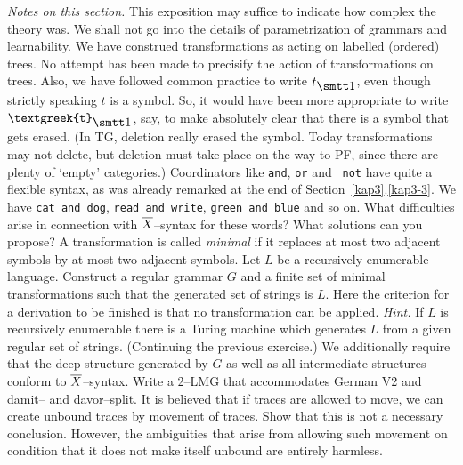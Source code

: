 {\it Notes on this section.}
This exposition may suffice to indicate how complex the theory
was. We shall not go into the details of parametrization of
grammars and learnability. We have construed transformations 
as acting on labelled (ordered) trees. No attempt has been 
made to precisify the action of transformations on trees. 
Also, we have followed common practice to write $t_{\seins}$, 
even though strictly speaking $t$ is a symbol. So, it would 
have been more appropriate to write $\mbox{\tt\textgreek{t}}_{\seins}$, 
say, to make absolutely clear that there is a symbol that gets 
erased. (In TG, deletion really erased the symbol. Today transformations 
may not delete, but deletion must take place on the way to 
PF, since there are plenty of `empty' categories.)
\vplatz
\exercise
Coordinators like {\tt and}, {\tt or} and {\tt
not} have quite a flexible syntax, as was already remarked at the
end of Section~\ref{kap3}.\ref{kap3-3}. We have {\tt cat and dog}, 
{\tt read and write}, {\tt green and blue} and so on. What difficulties
arise in connection with $\overline{X}$--syntax for these words? What
solutions can you propose?
\vplatz
\exercise
A transformation is called {\it minimal} if it
replaces at most two adjacent symbols by at most two adjacent
symbols. Let $L$ be a recursively enumerable language. Construct a
regular grammar $G$ and a finite set of minimal transformations
such that the generated set of strings is $L$. Here the criterion
for a derivation to be finished is that no transformation can be
applied. {\it Hint.} If $L$  is recursively enumerable there is a
Turing machine which generates $L$ from a given regular set of
strings.
\vplatz
\exercise
(Continuing the previous exercise.) We additionally require that
the deep structure generated by $G$ as well as all intermediate
structures conform to $\overline{X}$--syntax.
\vplatz 
\exercise 
Write a 2--LMG that accommodates German V2 and
{\rm damit}-- and {\rm davor}--split.
\vplatz
\exercise
It is believed that if traces are allowed to move, we can create
unbound traces by movement of traces. Show that this is not
a necessary conclusion. However, the ambiguities that arise from
allowing such movement on condition that it does not make itself
unbound are entirely harmless.
